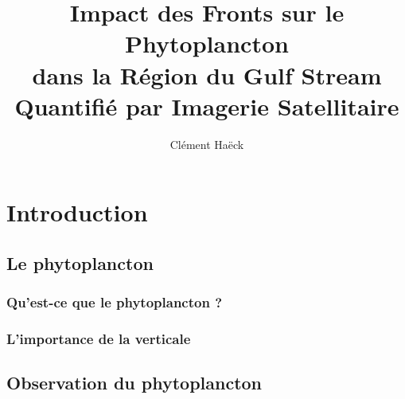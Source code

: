 
\usepackage{soutenance}


\title{%
  Impact des Fronts sur le Phytoplancton\\
  dans la Région du Gulf Stream\\
  Quantifié par Imagerie Satellitaire
}

\author{Clément Haëck}





{
  \begin{frame}
    \titlepage%
  \end{frame}
}

\section*{Introduction}
\subsection{Le phytoplancton}


\begin{frame}
  \frametitle{Qu'est-ce que le phytoplancton ?}
  {
    \centering
  }
\end{frame}


\begin{frame}
  \frametitle{L'importance de la verticale}
  {
    \centering
  }

\end{frame}


\subsection{Observation du phytoplancton}

